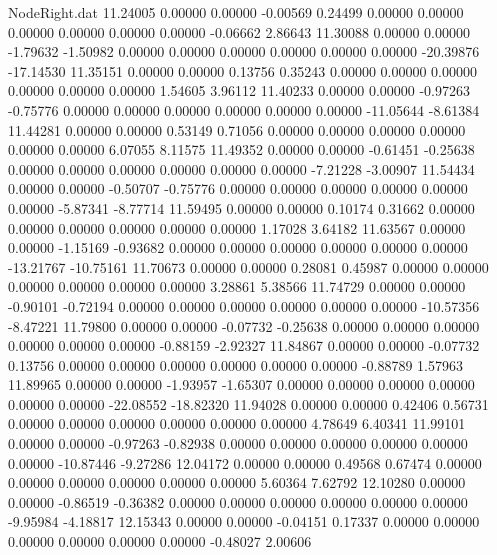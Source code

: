 \begin{filecontents}{NodeRight.dat}
  11.24005    0.00000    0.00000    -0.00569    0.24499    0.00000    0.00000    0.00000    0.00000    0.00000    0.00000   -0.06662    2.86643
  11.30088    0.00000    0.00000    -1.79632   -1.50982    0.00000    0.00000    0.00000    0.00000    0.00000    0.00000  -20.39876  -17.14530
  11.35151    0.00000    0.00000     0.13756    0.35243    0.00000    0.00000    0.00000    0.00000    0.00000    0.00000    1.54605    3.96112
  11.40233    0.00000    0.00000    -0.97263   -0.75776    0.00000    0.00000    0.00000    0.00000    0.00000    0.00000  -11.05644   -8.61384
  11.44281    0.00000    0.00000     0.53149    0.71056    0.00000    0.00000    0.00000    0.00000    0.00000    0.00000    6.07055    8.11575
  11.49352    0.00000    0.00000    -0.61451   -0.25638    0.00000    0.00000    0.00000    0.00000    0.00000    0.00000   -7.21228   -3.00907
  11.54434    0.00000    0.00000    -0.50707   -0.75776    0.00000    0.00000    0.00000    0.00000    0.00000    0.00000   -5.87341   -8.77714
  11.59495    0.00000    0.00000     0.10174    0.31662    0.00000    0.00000    0.00000    0.00000    0.00000    0.00000    1.17028    3.64182
  11.63567    0.00000    0.00000    -1.15169   -0.93682    0.00000    0.00000    0.00000    0.00000    0.00000    0.00000  -13.21767  -10.75161
  11.70673    0.00000    0.00000     0.28081    0.45987    0.00000    0.00000    0.00000    0.00000    0.00000    0.00000    3.28861    5.38566
  11.74729    0.00000    0.00000    -0.90101   -0.72194    0.00000    0.00000    0.00000    0.00000    0.00000    0.00000  -10.57356   -8.47221
  11.79800    0.00000    0.00000    -0.07732   -0.25638    0.00000    0.00000    0.00000    0.00000    0.00000    0.00000   -0.88159   -2.92327
  11.84867    0.00000    0.00000    -0.07732    0.13756    0.00000    0.00000    0.00000    0.00000    0.00000    0.00000   -0.88789    1.57963
  11.89965    0.00000    0.00000    -1.93957   -1.65307    0.00000    0.00000    0.00000    0.00000    0.00000    0.00000  -22.08552  -18.82320
  11.94028    0.00000    0.00000     0.42406    0.56731    0.00000    0.00000    0.00000    0.00000    0.00000    0.00000    4.78649    6.40341
  11.99101    0.00000    0.00000    -0.97263   -0.82938    0.00000    0.00000    0.00000    0.00000    0.00000    0.00000  -10.87446   -9.27286
  12.04172    0.00000    0.00000     0.49568    0.67474    0.00000    0.00000    0.00000    0.00000    0.00000    0.00000    5.60364    7.62792
  12.10280    0.00000    0.00000    -0.86519   -0.36382    0.00000    0.00000    0.00000    0.00000    0.00000    0.00000   -9.95984   -4.18817
  12.15343    0.00000    0.00000    -0.04151    0.17337    0.00000    0.00000    0.00000    0.00000    0.00000    0.00000   -0.48027    2.00606

\end{filecontents}
